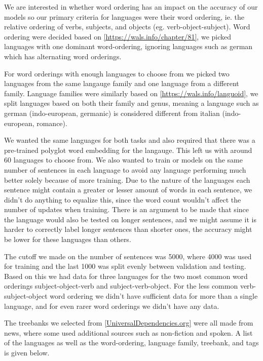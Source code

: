 We are interested in whether word ordering has an impact on the accuracy of our models so our primary criteria for languages were their word ordering, ie. the relative ordering of verbs, subjects, and objects (eg. verb-object-subject).
Word ordering were decided based on \ref{https://wals.info/chapter/81}, we picked languages with one dominant word-ordering, ignoring languages such as german which has alternating word orderings. 

For word orderings with enough languages to choose from we picked two languages from the same langauge family and one language from a different family.
Language families were similarly based on \ref{https://wals.info/languoid}, we split languages based on both their family and genus, meaning a language such as german (indo-european, germanic) is considered different from italian (indo-european, romance).

We wanted the same languages for both tasks and also required that there was a pre-trained polyglot word embedding for the langauge. 
This left us with around 60 languages to choose from. 
We also wanted to train or models on the same number of sentences in each language to avoid any language performing much better solely because of more training. 
Due to the nature of the languages each sentence might contain a greater or lesser amount of words in each sentence, we didn't do anything to equalize this, since the word count wouldn't affect the number of updates when training.
There is an argument to be made that since the language would also be tested on longer sentences, and we might assume it is harder to correctly label longer sentences than shorter ones, the accuracy might be lower for these languages than others. 

The cutoff we made on the number of sentences was 5000, where 4000 was used for training and the last 1000 was split evenly between validation and testing.
Based on this we had data for three languages for the two most common word orderings subject-object-verb and subject-verb-object.
For the less common verb-subject-object word ordering we didn't have sufficient data for more than a single language, and for even rarer word orderings we didn't have any data.

The treebanks we selected from \ref{UniversalDependencies.org} were all made from news, where some used additional sources such as non-fiction and spoken.
A list of the languages as well as the word-ordering, language family, treebank, and tags is given below.

